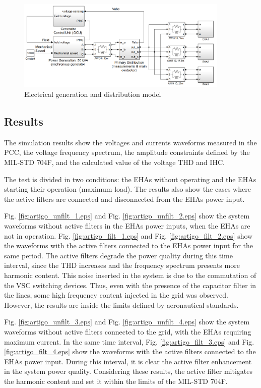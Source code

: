 \begin{figure}[!tb] %
	\centering
	\includegraphics[width=0.9\textwidth]{Figures/simulacao_simulink.png}
	\caption{Electrical generation and distribution model}
	\label{fig:simulacao_simulink.png}
\end{figure}

\subsection{Results}

The simulation results show the voltages and currents waveforms measured in the PCC, the voltage frequency spectrum, the amplitude constraints defined by the MIL-STD 704F, and the calculated value of the voltage THD and IHC.

The test is divided in two conditions:  the EHAs without operating and the EHAs starting their operation (maximum load). The results also show the cases where the active filters are connected and disconnected from the EHAs power input.

Fig. \ref{fig:artigo_unfilt_1.eps} and Fig. \ref{fig:artigo_unfilt_2.eps} show the system waveforms without active filters in the EHAs power inputs, when the EHAs are not in operation. Fig. \ref{fig:artigo_filt_1.eps} and Fig. \ref{fig:artigo_filt_2.eps} show the waveforms with the active filters connected to the EHAs power input for the same period. The active filters degrade the power quality during this time interval, since the THD increases and the frequency spectrum presents more harmonic content. This noise inserted in the system is due to the commutation of the VSC switching devices. Thus, even with the presence of the capacitor filter in the lines, some high frequency content injected in the grid was observed. However, the results are inside the limits defined by aeronautical standards.

Fig. \ref{fig:artigo_unfilt_3.eps} and Fig. \ref{fig:artigo_unfilt_4.eps} show the system waveforms without active filters connected to the grid, with the EHAs requiring maximum current. In the same time interval, Fig. \ref{fig:artigo_filt_3.eps} and Fig. \ref{fig:artigo_filt_4.eps} show the waveforms with the active filters connected to the EHAs power input. During this interval, it is clear the active filter enhancement in the system power quality. Considering these results, the active filter mitigates the harmonic content and set it within the limits of the MIL-STD 704F.

